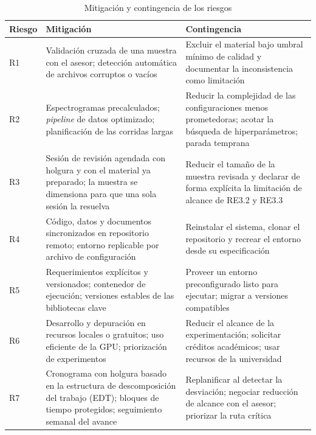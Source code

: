 \begin{table}[!htbp]
    \centering
    \caption{Mitigación y contingencia de los riesgos}
    \label{tab:riesgos-acciones}
    \small
    \begin{tabular}{@{}lL{6.6cm}L{6.6cm}@{}}
        \toprule
        \textbf{Riesgo} & \textbf{Mitigación} & \textbf{Contingencia} \\
        \midrule
        R1 & Validación cruzada de una muestra con el asesor; detección automática de archivos corruptos o vacíos & Excluir el material bajo umbral mínimo de calidad y documentar la inconsistencia como limitación \\
        \addlinespace
        R2 & Espectrogramas precalculados; \textit{pipeline} de datos optimizado; planificación de las corridas largas & Reducir la complejidad de las configuraciones menos prometedoras; acotar la búsqueda de hiperparámetros; parada temprana \\
        \addlinespace
        R3 & Sesión de revisión agendada con holgura y con el material ya preparado; la muestra se dimensiona para que una sola sesión la resuelva & Reducir el tamaño de la muestra revisada y declarar de forma explícita la limitación de alcance de RE3.2 y RE3.3 \\
        \addlinespace
        R4 & Código, datos y documentos sincronizados en repositorio remoto; entorno replicable por archivo de configuración & Reinstalar el sistema, clonar el repositorio y recrear el entorno desde su especificación \\
        \addlinespace
        R5 & Requerimientos explícitos y versionados; contenedor de ejecución; versiones estables de las bibliotecas clave & Proveer un entorno preconfigurado listo para ejecutar; migrar a versiones compatibles \\
        \addlinespace
        R6 & Desarrollo y depuración en recursos locales o gratuitos; uso eficiente de la GPU; priorización de experimentos & Reducir el alcance de la experimentación; solicitar créditos académicos; usar recursos de la universidad \\
        \addlinespace
        R7 & Cronograma con holgura basado en la estructura de descomposición del trabajo (EDT); bloques de tiempo protegidos; seguimiento semanal del avance & Replanificar al detectar la desviación; negociar reducción de alcance con el asesor; priorizar la ruta crítica \\
        \bottomrule
    \end{tabular}
\end{table}

